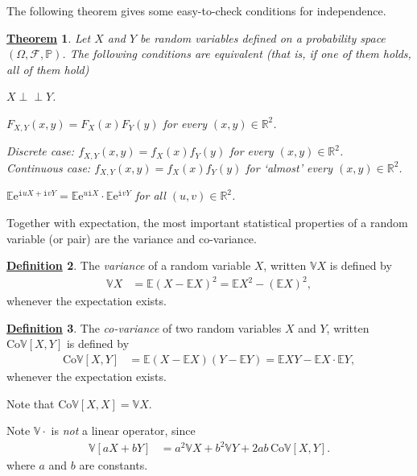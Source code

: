 \documentclass[12pt]{book}
\numberwithin{equation}{chapter}
\theoremstyle{plain}
\newtheorem{theorem}{\underline{Theorem}}
\numberwithin{theorem}{section}
\theoremstyle{definition}
\newtheorem{definition}[theorem]{\underline{Definition}}
\numberwithin{exercise}{chapter}
\newcommand{\<}{\langle}
\renewcommand{\>}{\rangle}
\renewcommand{\(}{\left(}
\renewcommand{\)}{\right)}
\renewcommand{\[}{\left[}
\renewcommand{\]}{\right]}
\newcommand\Eb{\mathds{E}}
\newcommand\Pb{\mathds{P}}
\newcommand\Rb{\mathds{R}}
\newcommand\Vb{\mathds{V}}
\newcommand\Fc{\mathscr{F}}
\newcommand\Om{\Omega}
\newcommand{\ind}{\perp \! \! \! \perp}
\newcommand\ii{\mathtt{i}}
\newcommand\ee{\mathrm{e}}
\begin{document}
\noindent
The following theorem gives some easy-to-check conditions for independence.

\begin{theorem}
Let $X$ and $Y$ be random variables defined on a probability space $(\Om,\Fc,\Pb)$.  The following conditions are equivalent (that is, if one of them holds, all of them hold)
\begin{enumerate*}
\item $X \ind Y$.
\item $F_{X,Y}(x,y) = F_X(x) F_Y(y)$ for every $(x,y) \in \Rb^2$.
\item Discrete case: $f_{X,Y}(x,y) = f_X(x) f_Y(y)$ for every $(x,y) \in \Rb^2$.\\
	Continuous case: $f_{X,Y}(x,y) = f_X(x) f_Y(y)$ for `almost' every $(x,y) \in \Rb^2$.
\item $\Eb \ee^{ \ii u X + \ii v Y} = \Eb \ee^{u \ii X} \cdot \Eb \ee^{ \ii v Y}$ for all $(u,v) \in \Rb^2$.
\end{enumerate*}
\end{theorem}

\noindent
Together with expectation, the most important statistical properties of a random variable (or pair) are the variance and co-variance.

\begin{definition}
The \emph{variance} of a random variable $X$, written $\Vb X $ is defined by
\begin{align}
\Vb X 
	&=	\Eb (X - \Eb X)^2 
	=		\Eb  X^2  - (\Eb X )^2 , \label{eq:var}
\end{align}
whenever the expectation exists.
\end{definition}

\begin{definition}
The \emph{co-variance} of two random variables $X$ and $Y$, written $\text{Co}\Vb[ X , Y ]$ is defined by
\begin{align}
\text{Co}\Vb[ X, Y ]
	&=	\Eb (X - \Eb X)(Y - \Eb Y) 
	=		\Eb X Y  - \Eb X \cdot \Eb Y  , \label{eq:covar}
\end{align}
whenever the expectation exists.
\end{definition}

\noindent
Note that $\text{Co}\Vb[ X, X ] = \Vb X$.

\noindent
Note $\Vb \cdot $ is \emph{not} a linear operator, since
\begin{align}
\Vb[ a X + b Y ]
	&=	a^2 \Vb X  + b^2 \Vb Y  + 2 ab \, \text{Co}\Vb[X,Y] .
\end{align}
where $a$ and $b$ are constants.
\end{document}
